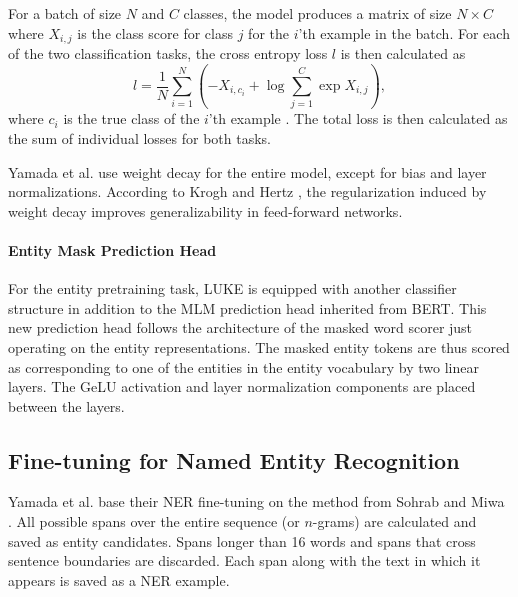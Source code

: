 \documentclass[main.tex]{subfiles}
\begin{document}
For a batch of size $ N $ and $ C $ classes, the model produces a matrix of size $ N\times C $ where $ X_{i, j} $ is the class score for class $ j $ for the $ i $'th example in the batch.
For each of the two classification tasks, the cross entropy loss $ l $ is then calculated as
\begin{equation}\label{eq:crossentropyloss}
    l = \frac{1}{N} \sum_{i=1}^N \left(
        -X_{i, c_i} + \log \sum_{j=1}^C \exp X_{i, j}
    \right),
\end{equation}
where $ c_i $ is the true class of the $ i $'th example \cite{pytorchcel}.
The total loss is then calculated as the sum of individual losses for both tasks.

Yamada et al. \cite{yamada2020luke} use weight decay for the entire model, except for bias and layer normalizations.
According to Krogh and Hertz \cite{krogh1991weight}, the regularization induced by weight decay improves generalizability in feed-forward networks.

\paragraph{Entity Mask Prediction Head}
For the entity pretraining task, LUKE is equipped with another classifier structure in addition to the MLM prediction head inherited from BERT.
This new prediction head follows the architecture of the masked word scorer just operating on the entity representations.
The masked entity tokens are thus scored as corresponding to one of the entities in the entity vocabulary by two linear layers.
The GeLU activation \cite{hendrycks2020gelu} and layer normalization components are placed between the layers.

\subsection{Fine-tuning for Named Entity Recognition}
\label{subsec:fine-tuning-theory}
Yamada et al. base their NER fine-tuning on the method from Sohrab and Miwa \cite{sohrab2018nestedner}.
All possible spans over the entire sequence (or $n$-grams) are calculated and saved as entity candidates.
Spans longer than 16 words and spans that cross sentence boundaries are discarded.
Each span along with the text in which it appears is saved as a NER example.
\end{document}
